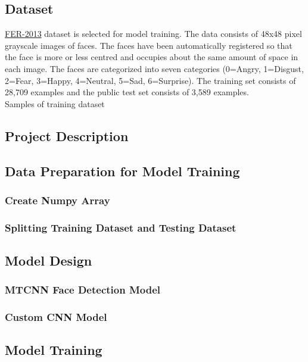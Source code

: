 \documentclass[11pt,a4paper]{article}
\begin{document}
    \subsection{Dataset}
    \href{https://www.kaggle.com/datasets/msambare/fer2013}{FER-2013}\cite{FER2013} dataset is selected for model training. The data consists of 48x48 pixel grayscale images of faces. The faces have been automatically registered so that the face is more or less centred and occupies about the same amount of space in each image. The faces are categorized into seven categories (0=Angry, 1=Disgust, 2=Fear, 3=Happy, 4=Neutral, 5=Sad, 6=Surprise). The training set consists of 28,709 examples and the public test set consists of 3,589 examples. \\
    Samples of training dataset
    \begin{}
    
    \subsection{Project Description}
    
    \subsection{Data Preparation for Model Training}
    \subsubsection{Create Numpy Array}
    
    \subsubsection{Splitting Training Dataset and Testing Dataset}
    
    \subsection{Model Design}
    \subsubsection{MTCNN Face Detection Model}
    
    \subsubsection{Custom CNN Model}
    
    \subsection{Model Training}

\end{}
\end{document}
